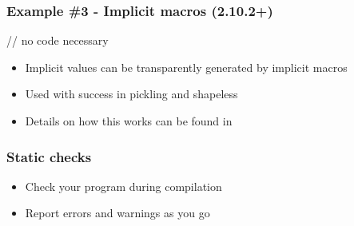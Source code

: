 \documentclass[svgnames,hyperref={bookmarks=false}]{beamer}
\begin{document}
\begin{frame}[fragile]
\frametitle{Example \#3 - Implicit macros (2.10.2+)}

\begin{semiverbatim}
// no code necessary

\end{semiverbatim}

\begin{itemize}
\item Implicit values can be transparently generated by implicit macros
\item Used with success in pickling and shapeless
\item Details on how this works can be found in 
\end{itemize}
\end{frame}

\begin{frame}[fragile]
\frametitle{}

\vskip40pt
\begin{center}
\end{center}
\end{frame}

\begin{frame}[fragile]
\frametitle{Static checks}

\begin{itemize}
\item Check your program during compilation
\item Report errors and warnings as you go
\end{itemize}
\end{frame}
\end{document}
